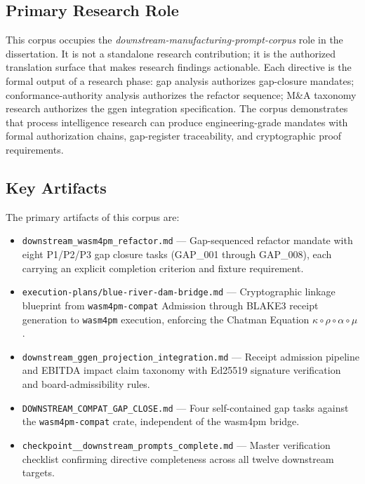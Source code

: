 \subsection{Primary Research Role}
\label{sec:prompts-identity-role}

This corpus occupies the \emph{downstream-manufacturing-prompt-corpus} role in the
dissertation. It is not a standalone research contribution; it is the authorized
translation surface that makes research findings actionable. Each directive is the
formal output of a research phase: gap analysis authorizes gap-closure mandates;
conformance-authority analysis authorizes the refactor sequence; M\&A taxonomy
research authorizes the ggen integration specification. The corpus demonstrates that
process intelligence research can produce engineering-grade mandates with formal
authorization chains, gap-register traceability, and cryptographic proof requirements.

\subsection{Key Artifacts}
\label{sec:prompts-identity-artifacts}

The primary artifacts of this corpus are:

\begin{itemize}
  \item \texttt{downstream\_wasm4pm\_refactor.md} --- Gap-sequenced refactor mandate
    with eight P1/P2/P3 gap closure tasks (GAP\_001 through GAP\_008), each carrying
    an explicit completion criterion and fixture requirement.
  \item \texttt{execution-plans/blue-river-dam-bridge.md} --- Cryptographic linkage
    blueprint from \texttt{wasm4pm-compat} Admission through BLAKE3 receipt
    generation to \texttt{wasm4pm} execution, enforcing the Chatman Equation
    $\kappa \circ \rho \circ \alpha \circ \mu$.
  \item \texttt{downstream\_ggen\_projection\_integration.md} --- Receipt admission
    pipeline and EBITDA impact claim taxonomy with Ed25519 signature verification and
    board-admissibility rules.
  \item \texttt{DOWNSTREAM\_COMPAT\_GAP\_CLOSE.md} --- Four self-contained gap tasks
    against the \texttt{wasm4pm-compat} crate, independent of the wasm4pm bridge.
  \item \texttt{checkpoint\_\_downstream\_prompts\_complete.md} --- Master
    verification checklist confirming directive completeness across all twelve
    downstream targets.
\end{itemize}
